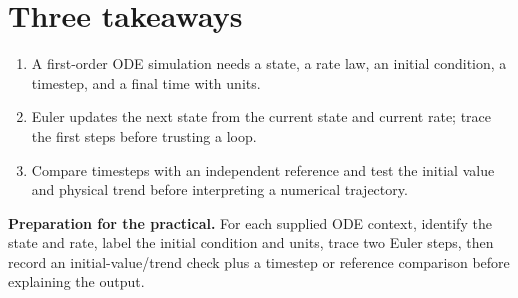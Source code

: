 \documentclass[11pt,a4paper]{article}
\begin{document}
\section*{Three takeaways}
\begin{enumerate}[nosep,leftmargin=6mm]
\item A first-order ODE simulation needs a state, a rate law, an initial condition, a timestep, and a final time with units.
\item Euler updates the next state from the current state and current rate; trace the first steps before trusting a loop.
\item Compare timesteps with an independent reference and test the initial value and physical trend before interpreting a numerical trajectory.
\end{enumerate}

\begin{keybox}\textbf{Preparation for the practical.} For each supplied ODE context, identify the state and rate, label the initial condition and units, trace two Euler steps, then record an initial-value/trend check plus a timestep or reference comparison before explaining the output.\end{keybox}
\end{document}
